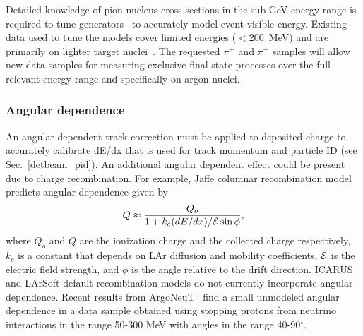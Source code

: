 Detailed knowledge of pion-nucleus cross sections in the sub-GeV energy range is required
to tune generators~\cite{genie} to accurately model event visible energy. 
Existing data used to tune the models
cover limited energies ($<$200~MeV) and are primarily on lighter target nuclei~\cite{fsirev}.
The requested $\pi^+$ and $\pi^-$ samples will allow new data samples for measuring
exclusive final state processes over the full relevant energy range and specifically on argon nuclei. 



 


\subsubsection{Angular dependence}

\label{sec_angle}


An angular dependent track correction must be
applied to deposited charge to accurately calibrate
dE/dx that is used for track momentum and particle ID (see Sec.~\ref{detbeam_pid}). 
An additional angular dependent effect could be present 
due to charge recombination. 
For example, Jaffe columnar recombination model~\cite{jaffe,argoneut_angle} predicts 
angular dependence given by 
$$Q \approx \frac{Q_o}{1+k_c (dE/dx) / {\cal E} \sin\phi}, $$ 
where
$Q_o$ and $Q$ are the ionization charge and the collected charge respectively, 
$k_c$ is a constant that depends on LAr diffusion and mobility coefficients, $\cal E$ 
is the electric field strength, and $\phi$ is the angle relative to the drift direction.
%
ICARUS~\cite{icarus_recombination} and LArSoft default recombination models do not currently incorporate angular dependence. 
Recent results from ArgoNeuT~\cite{argoneut_angle} find a small unmodeled
angular dependence in a data sample obtained using stopping protons from 
neutrino interactions in the range 50-300 MeV with angles in the range 40-90$^{\circ}$.

